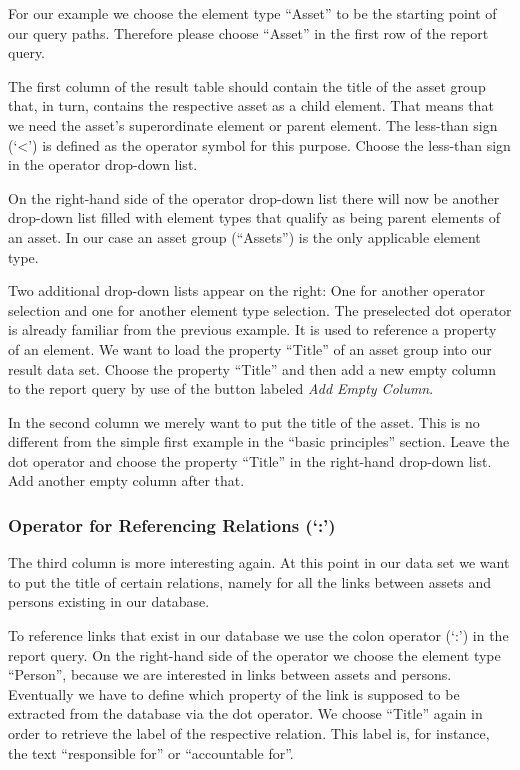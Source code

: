 \documentclass[a4paper,10pt]{book}
\begin{document}
For our example we choose the element type ``Asset'' to be the starting point of
our query paths. Therefore please choose ``Asset'' in the first row of the
report query.

The first column of the result table should contain the title of the asset group
that, in turn, contains the respective asset as a child element. That means that
we need the asset's superordinate element or parent element. The less-than sign
(`\textless{}') is defined as the operator symbol for this purpose. Choose the
less-than sign in the operator drop-down list.

On the right-hand side of the operator drop-down list there will now be another
drop-down list filled with element types that qualify as being parent elements
of an asset. In our case an asset group (``Assets'') is the only applicable
element type.

Two additional drop-down lists appear on the right: One for another operator
selection and one for another element type selection. The preselected dot
operator is already familiar from the previous example. It is used to reference
a property of an element. We want to load the property ``Title'' of an asset
group into our result data set. Choose the property ``Title'' and then add a new
empty column to the report query by use of the button labeled \emph{Add Empty
Column}.

In the second column we merely want to put the title of the asset. This is no
different from the simple first example in the ``basic principles'' section.
Leave the dot operator and choose the property ``Title'' in the right-hand
drop-down list. Add another empty column after that.

\subsubsection{\texorpdfstring{Operator for Referencing Relations
(`:')}{Operator for Referencing Relations (:)}}\label{operator-for-referencing-relations}

The third column is more interesting again. At this point in our data set we
want to put the title of certain relations, namely for all the links between
assets and persons existing in our database.

To reference links that exist in our database we use the colon operator (`:') in
the report query. On the right-hand side of the operator we choose the element
type ``Person'', because we are interested in links between assets and persons.
Eventually we have to define which property of the link is supposed to be
extracted from the database via the dot operator. We choose ``Title'' again in
order to retrieve the label of the respective relation. This label is, for
instance, the text ``responsible for'' or ``accountable for''.
\end{document}
